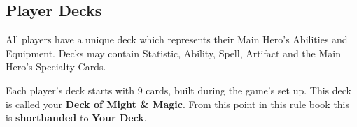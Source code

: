 
\begin{multicols*}{2}

\subsection*{\hypertarget{Playerdecks}{Player Decks}}
All players have a unique deck which represents their Main Hero's Abilities and Equipment.
Decks may contain Statistic, Ability, Spell, Artifact and the Main Hero's Specialty Cards.

Each player's deck starts with 9 cards, built during the game's set up.
This deck is called your \textbf{Deck of Might \& Magic}. From this point in this rule book this is \textbf{shorthanded} to \textbf{Your Deck}.

\end{multicols*}
